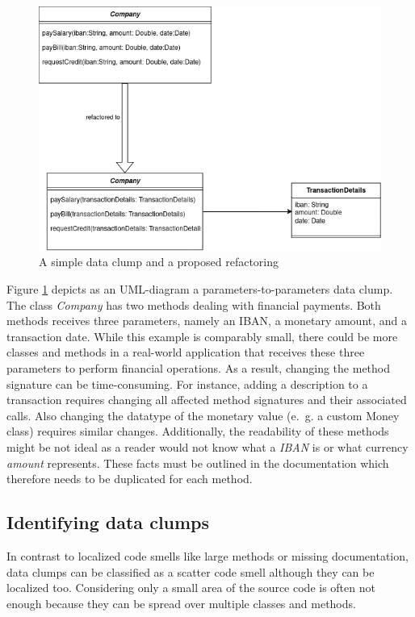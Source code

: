 \begin{figure}
    \centering
    \includegraphics[width=0.75\columnwidth]{figures/chapter2/dataClump/refactor_simple_case.png}
    \caption{A simple data clump and a proposed refactoring}
    \label{fig:company_bill_tax}
\end{figure}
Figure \ref{fig:company_bill_tax} depicts as an UML-diagram a parameters-to-parameters data clump. The class \textit{Company} has two methods dealing with financial payments. Both methods  receives three parameters, namely an IBAN, a monetary amount, and a transaction date. While this example is comparably small, there could be more classes and methods in a real-world application that receives these three parameters to perform financial operations. As a result, changing the method signature can be time-consuming. For instance, adding a description to a transaction requires changing all affected method signatures and their associated calls. Also changing the datatype of the monetary value (e.~g. a custom Money class) requires similar changes. Additionally, the readability of these methods might be not ideal as a reader would not know what a \textit{IBAN} is or what currency \textit{amount} represents. These facts must be outlined in the documentation which therefore needs to be duplicated for each method. 
 
\subsection{Identifying data clumps}\label{sec:data_clump_detection}
In contrast to localized code smells like large methods or missing documentation, data clumps can be classified as a scatter code smell although they can be localized too. Considering only a small area of the source code is often not enough because they can be spread over multiple classes and methods. 

